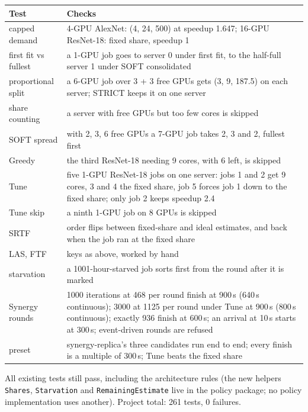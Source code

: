 \documentclass[11pt,a4paper]{article}
\newcommand{\code}[1]{\texttt{#1}}
\begin{document}
\begin{center}
\begin{tabularx}{\linewidth}{@{}lX@{}}
\toprule
Test & Checks \\
\midrule
capped demand & 4-GPU AlexNet: (4, 24, 500) at speedup 1.647; 16-GPU ResNet-18: fixed share, speedup 1 \\
first fit vs fullest & a 1-GPU job goes to server 0 under first fit, to the half-full server 1 under SOFT
  consolidated \\
proportional split & a 6-GPU job over 3 + 3 free GPUs gets (3, 9, 187.5) on each server; STRICT keeps
  it on one server \\
share counting & a server with free GPUs but too few cores is skipped \\
SOFT spread & with 2, 3, 6 free GPUs a 7-GPU job takes 2, 3 and 2, fullest first \\
Greedy & the third ResNet-18 needing 9 cores, with 6 left, is skipped \\
Tune & five 1-GPU ResNet-18 jobs on one server: jobs 1 and 2 get 9 cores, 3 and 4 the fixed share, job 5
  forces job 1 down to the fixed share; only job 2 keeps speedup 2.4 \\
Tune skip & a ninth 1-GPU job on 8 GPUs is skipped \\
SRTF & order flips between fixed-share and ideal estimates, and back when the job ran at the fixed share \\
LAS, FTF & keys as above, worked by hand \\
starvation & a 1001-hour-starved job sorts first from the round after it is marked \\
Synergy rounds & 1000 iterations at 468 per round finish at 900\,s (640\,s continuous); 3000 at 1125
  per round under Tune at 900\,s (800\,s continuous); exactly 936 finish at 600\,s; an arrival at 10\,s
  starts at 300\,s; event-driven rounds are refused \\
preset & synergy-replica's three candidates run end to end; every finish is a multiple of 300\,s; Tune
  beats the fixed share \\
\bottomrule
\end{tabularx}
\end{center}

All existing tests still pass, including the architecture rules (the new helpers \code{Shares},
\code{Starvation} and \code{RemainingEstimate} live in the policy package; no policy implementation uses
another). Project total: 261 tests, 0 failures.
\end{document}
